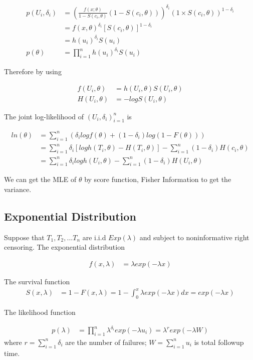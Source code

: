 \documentclass[11pt]{article} %
\begin{document}
\begin{align*}
	p(U_i, \delta_i) & = \left(\frac{f(x; \theta)}{1- S(c_i, \theta)} (1- S(c_i, \theta)) \right)^{\delta_i} \left(1 \times S(c_i, \theta) \right)^{1-\delta_i} \\
		&=f(x, \theta)^{\delta_i} [S(c_i, \theta)]^{1-\delta_i}\\
		&= h(u_i)^{\delta_i} S(u_i)\\
	p(\theta) &= \prod_{i=1}^n h(u_i)^{\delta_i} S(u_i)
\end{align*}

	
Therefore by using

\begin{align*}
	f(U_i, \theta) & = h(U_i, \theta) S(U_i, \theta) \\
	H(U_i, \theta) &= -log S(U_i, \theta)
\end{align*}

The joint log-likelihood of ${(U_i, \delta_i)}_{i=1}^n$ is

\begin{align*}
	ln(\theta) & = \sum_{i=1}^n \left(\delta_i log f(\theta) + (1-\delta_i) log (1- F(\theta)) \right) \\
	&= \sum_{i=1}^n \delta_i \left[log h(T_i, \theta) - H(T_i, \theta) \right] - \sum_{i=1}^n  (1-\delta_i) H(c_i, \theta)  \\
	&= \sum_{i=1}^n \delta_i log h(U_i, \theta) - \sum_{i=1}^n  (1-\delta_i) H(U_i,  \theta)
\end{align*}

We can get the MLE of $\theta$ by score function, Fisher Information to get the variance. 

\subsection{Exponential Distribution}
Suppose that $T_1, T_2, ... T_n$ are i.i.d $Exp(\lambda)$ and subject to noninformative right censoring. The exponential distribution

\begin{align*}
	f(x, \lambda) & = \lambda exp(-\lambda x)
\end{align*}

The survival function
\begin{align*}
	S(x, \lambda) & = 1- F(x, \lambda) =1- \int_{0}^x \lambda exp(-\lambda x) dx = exp(-\lambda x)
\end{align*}

The likelihood function

\begin{align*}
	p(\lambda) & = \prod_{i=1}^n \lambda^{\delta_i} exp(-\lambda u_i) = \lambda^r exp(-\lambda W)
\end{align*}
where $r = \sum_{i=1}^n \delta_i$ are the number of failures; $W=\sum_{i=1}^n u_i$ is total followup time.
\end{document}
